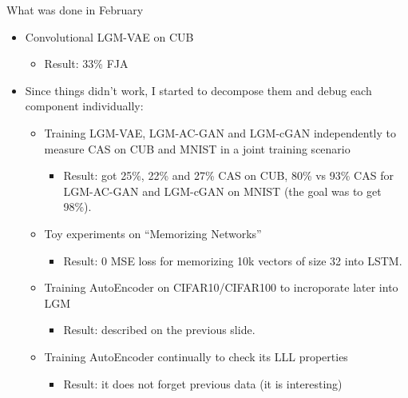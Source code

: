 \documentclass[10pt]{beamer}
\begin{document}
\begin{frame}{What was done in February}
    \begin{itemize}
        \item\pause Convolutional LGM-VAE on CUB
        \begin{itemize}
            \item\pause Result: 33\% FJA
        \end{itemize}
        \item\pause Since things didn't work, I started to decompose them and debug each component individually:
        \begin{itemize}
            \item\pause Training LGM-VAE, LGM-AC-GAN and LGM-cGAN independently to measure CAS on CUB and MNIST in a joint training scenario
            \begin{itemize}
                \item\pause Result: got 25\%, 22\% and 27\% CAS on CUB, 80\% vs 93\% CAS for LGM-AC-GAN and LGM-cGAN on MNIST (the goal was to get 98\%).
            \end{itemize}
            \item\pause Toy experiments on ``Memorizing Networks''
                \begin{itemize}
                    \item\pause Result: 0 MSE loss for memorizing 10k vectors of size 32 into LSTM.
                \end{itemize}
            \item\pause Training AutoEncoder on CIFAR10/CIFAR100 to incroporate later into LGM
            \begin{itemize}
                \item\pause Result: described on the previous slide.
            \end{itemize}
            \item\pause Training AutoEncoder continually to check its LLL properties
            \begin{itemize}
                \item Result: it does not forget previous data (it is interesting)
            \end{itemize}
        \end{itemize}
    \end{itemize}
\end{frame}
\end{document}
